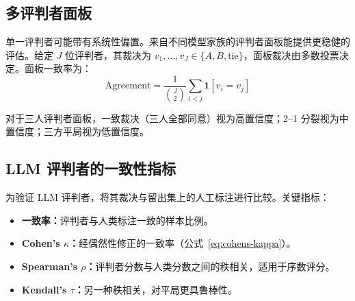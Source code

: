 \subsection{多评判者面板}
\label{multi-judge-panels}

单一评判者可能带有系统性偏置。来自不同模型家族的评判者面板能提供更稳健的评估。给定 $J$ 位评判者，其裁决为 $v_1, \ldots, v_J \in \{A, B, \text{tie}\}$，面板裁决由多数投票决定。面板一致率为：
\begin{equation}
    \text{Agreement} = \frac{1}{\binom{J}{2}} \sum_{i < j} \mathbf{1}[v_i = v_j]
\end{equation}

对于三人评判者面板，一致裁决（三人全部同意）视为高置信度；2--1 分裂视为中置信度；三方平局视为低置信度。

\subsection{LLM 评判者的一致性指标}
\label{agreement-metrics-for-llm-judges}

为验证 LLM 评判者，将其裁决与留出集上的人工标注进行比较。关键指标：

\begin{itemize}
  \item \textbf{一致率：}评判者与人类标注一致的样本比例。
  \item \textbf{Cohen's $\kappa$：}经偶然性修正的一致率（公式~\ref{eq:cohens-kappa}）。
  \item \textbf{Spearman's $\rho$：}评判者分数与人类分数之间的秩相关，适用于序数评分。
  \item \textbf{Kendall's $\tau$：}另一种秩相关，对平局更具鲁棒性。
\end{itemize}

